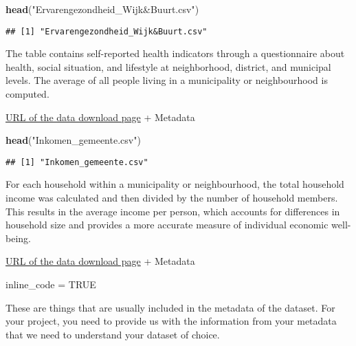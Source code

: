 \documentclass[
]{article}
\newenvironment{Shaded}{\begin{snugshade}}{\end{snugshade}}
\newcommand{\ConstantTok}[1]{\textcolor[rgb]{0.56,0.35,0.01}{#1}}
\newcommand{\FunctionTok}[1]{\textcolor[rgb]{0.13,0.29,0.53}{\textbf{#1}}}
\newcommand{\NormalTok}[1]{#1}
\newcommand{\OtherTok}[1]{\textcolor[rgb]{0.56,0.35,0.01}{#1}}
\newcommand{\StringTok}[1]{\textcolor[rgb]{0.31,0.60,0.02}{#1}}
\begin{document}
\begin{Shaded}
\begin{Highlighting}[]
\FunctionTok{head}\NormalTok{(}\StringTok{"Ervarengezondheid\_Wijk\&Buurt.csv"}\NormalTok{)}
\end{Highlighting}
\end{Shaded}

\begin{verbatim}
## [1] "Ervarengezondheid_Wijk&Buurt.csv"
\end{verbatim}

The table contains self-reported health indicators through a
questionnaire about health, social situation, and lifestyle at
neighborhood, district, and municipal levels. The average of all people
living in a municipality or neighbourhood is computed.

\href{https://statline.rivm.nl/portal.html?_la=nl&_catalog=RIVM&tableId=50120NED&_theme=94}{URL
of the data download page} + Metadata

\begin{Shaded}
\begin{Highlighting}[]
\FunctionTok{head}\NormalTok{(}\StringTok{"Inkomen\_gemeente.csv"}\NormalTok{)}
\end{Highlighting}
\end{Shaded}

\begin{verbatim}
## [1] "Inkomen_gemeente.csv"
\end{verbatim}

For each household within a municipality or neighbourhood, the total
household income was calculated and then divided by the number of
household members. This results in the average income per person, which
accounts for differences in household size and provides a more accurate
measure of individual economic well-being.

\href{https://www.cbs.nl/nl-nl/maatwerk/2023/35/inkomen-per-gemeente-en-wijk-2020}{URL
of the data download page} + Metadata

\begin{Shaded}
\begin{Highlighting}[]
\NormalTok{inline\_code }\OtherTok{=} \ConstantTok{TRUE}
\end{Highlighting}
\end{Shaded}

These are things that are usually included in the metadata of the
dataset. For your project, you need to provide us with the information
from your metadata that we need to understand your dataset of choice.
\end{document}
